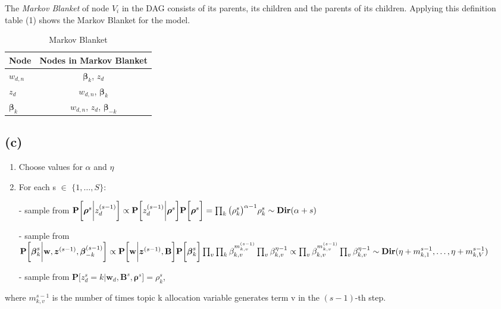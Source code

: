 \documentclass[11pt]{article}
\begin{document}
The \textit{Markov Blanket} of node $V_i$ in the DAG consists of its parents, its children and the parents of its children. Applying this definition table (1) shows the Markov Blanket for the model.\\

\begin{table}[!htb]
\centering
\begin{tabular}{ l | c  }
	\textbf{Node} & \textbf{Nodes in Markov Blanket} \\
	\hline
	$w_{d,n}$ & $\boldsymbol{\beta}_k$, $z_d$  \\
	$z_d$& $w_{d,n}$, $\boldsymbol{\beta}_k$  \\
	$\boldsymbol{\beta}_k$&$w_{d,n}$, $z_d$, $\boldsymbol{\beta}_{-k}$
\end{tabular}
\caption{Markov Blanket}
\label{table:tab1}
\end{table}

\subsection*{(c)}

\begin{enumerate}
	\item Choose values for $\alpha$ and $\eta$
	\item For each s $\in$ $\{1,\dots,S\}$: 
	\item[-] sample from $\textbf{P}\bigg[\boldsymbol{\rho}^s\bigg|z_d^{(s-1)}\bigg] \propto \textbf{P}\bigg[z_d^{(s-1)}\bigg|\boldsymbol{\rho}^s\bigg]\textbf{P}\bigg[\boldsymbol{\rho}^s\bigg] \\ = \prod_{k} \big( \rho_k^s \big)^{\alpha - 1 }  \rho_k^s \\ \sim \textbf{Dir}(\alpha + s)$
	\item[-]  sample from $\textbf{P}\bigg[\boldsymbol{\beta}_k^s \bigg| \textbf{w}, \boldsymbol{z}^{(s-1)}, \boldsymbol{\beta}_{-k}^{(s-1)} \bigg] \propto  \textbf{P}\bigg[\textbf{w} \bigg| \boldsymbol{z}^{(s-1)}, \textbf{B}\bigg]\textbf{P}\bigg[\boldsymbol{\beta}_k^s \bigg] \\ \prod_{v}\prod_{k} \beta_{k,v}^{m^{(s-1)}_{k,v} } \prod_{v} \beta_{k,v}^{\eta-1} \propto \prod_{v} \beta_{k,v}^{m^{(s-1)}_{k,v} } \prod_{v} \beta_{k,v}^{\eta-1}  \\ \sim \textbf{Dir}(\eta + m_{k,1}^{s-1},\dots,\eta + m_{k,V}^{s-1}) $
	\item[-] sample from $\textbf{P}\bigg[z_d^s = k \bigg| \textbf{w}_d, \textbf{B}^s,\boldsymbol{\rho}^s\bigg] = \rho_k^s$,
\end{enumerate}
where $m_{k,v}^{s-1}$ is the number of times topic k allocation variable generates term v in the $(s-1)$-th step. 
\end{document}
